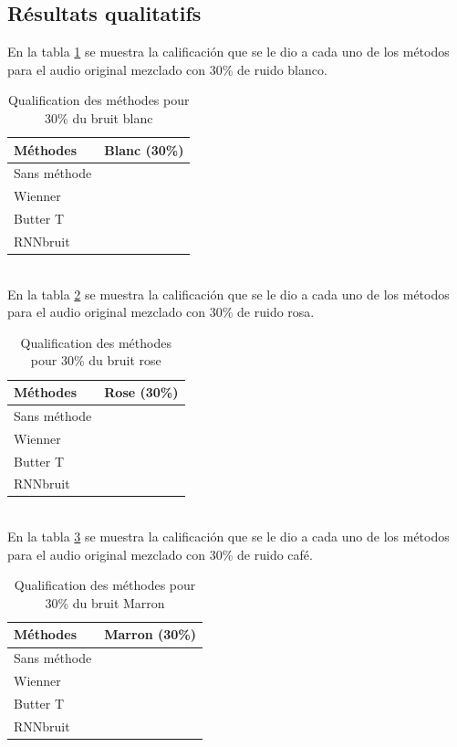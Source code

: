 \documentclass[conference,onecolumn]{IEEEtran}
\begin{document}
\subsection{Résultats qualitatifs}
\hfill
En la tabla \ref{table:t4} se muestra la calificación que se le dio a cada uno de los métodos para el audio original mezclado con 30\% de ruido blanco.
\begin{table}[hbt!]
    \centering
    \begin{tabular}{ l  c }
    \textbf{Méthodes} & \textbf{Blanc (30\%)} \\
    \hline
    Sans méthode &  \\
    Wienner &  \\
    Butter T &  \\
    RNNbruit &  \\
    \end{tabular}
    \caption{Qualification des méthodes pour 30\% du bruit blanc}
    \label{table:t4}
\end{table}
\hfill \\
En la tabla \ref{table:t5} se muestra la calificación que se le dio a cada uno de los métodos para el audio original mezclado con 30\% de ruido rosa.  
\begin{table}[hbt!]
    \centering
    \begin{tabular}{ l  c }
    \textbf{Méthodes} & \textbf{Rose (30\%)} \\
    \hline
    Sans méthode &  \\
    Wienner &  \\
    Butter T &  \\
    RNNbruit &  \\
    \end{tabular}
    \caption{Qualification des méthodes pour 30\% du bruit rose}
    \label{table:t5}
\end{table}
\hfill \\
En la tabla \ref{table:t6} se muestra la calificación que se le dio a cada uno de los métodos para el audio original mezclado con 30\% de ruido café.
\begin{table}[hbt!]
    \centering
    \begin{tabular}{ l  c }
    \textbf{Méthodes} & \textbf{Marron (30\%)} \\
    \hline
    Sans méthode &  \\
    Wienner &  \\
    Butter T &  \\
    RNNbruit &  \\
    \end{tabular}
    \caption{Qualification des méthodes pour 30\% du bruit Marron}
    \label{table:t6}
\end{table}
\hfill \\
\end{document}
